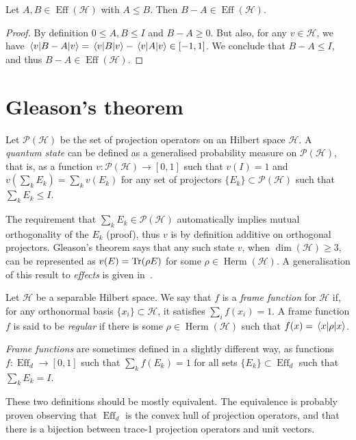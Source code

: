 \documentclass[12pt]{report}
\newcommand{\on}[1]{\operatorname{#1}}
\newcommand{\calH}{{\mathcal{H}}}
\newcommand{\calP}{{\mathcal{P}}}
\DeclareMathOperator{\Herm}{Herm}
\begin{document}
\begin{prop}
	Let $A,B\in\on{Eff}(\calH)$ with $A\le B$. Then $B-A\in\on{Eff}(\calH)$.
	\label{prop:diff_of_effects_is_effect}
\end{prop}
\begin{proof}
	By definition $0\le A,B\le I$ and $B-A\ge 0$.
	But also, for any $v\in\calH$, we have
	$\mel{v}{B-A}{v}=\mel{v}{B}{v}-\mel{v}{A}{v}\in[-1,1]$.
	We conclude that $B-A\le I$, and thus $B-A\in\on{Eff}(\calH)$.
\end{proof}


\section{Gleason's theorem}

\begin{defn}
	Let $\calP(\calH)$ be the set of projection operators on an Hilbert space $\calH$. A \emph{quantum state} can be defined as a generalised probability measure on $\calP(\calH)$, that is, as a function $v:\calP(\calH)\to[0,1]$ such that $v(I)=1$ and
	$v(\sum_k E_k) = \sum_k v(E_k)$
	for any set of projectors $\{E_k\}\subset\calP(\calH)$ such that $\sum_k E_k\le I$.
\end{defn}
The requirement that $\sum_k E_k\in\calP(\calH)$ automatically implies mutual orthogonality of the $E_k$ (proof), thus $v$ is by definition additive on orthogonal projectors.
Gleason's theorem says that any such state $v$, when $\dim(\calH)\ge3$, can be represented as $v(E)=\Tr(\rho E)$ for some $\rho\in\Herm(\calH)$.
A generalisation of this result to \emph{effects} is given in~\parencite{busch2003quantum,caves2004gleasontype}.

\begin{defn}
	Let $\calH$ be a separable Hilbert space.
	We say that $f$ is a \emph{frame function} for $\calH$ if, for any orthonormal basis $\{x_i\}\subset\calH$, it satisfies
	$\sum_i f(x_i) = 1$.
	A frame function $f$ is said to be \emph{regular} if there is some $\rho\in\Herm(\calH)$ such that $f(x)=\mel{x}{\rho}{x}$.
\end{defn}

\begin{defn}
	\emph{Frame functions} are sometimes defined in a slightly different way, as functions $f:\on{Eff}_d\to[0,1]$ such that $\sum_k f(E_k)=1$ for all sets $\{E_k\}\subset\on{Eff}_d$ such that $\sum_k E_k=I$.
\end{defn}
These two definitions should be mostly equivalent. The equivalence is probably proven observing that $\on{Eff}_d$ is the convex hull of projection operators, and that there is a bijection between trace-1 projection operators and unit vectors.
\end{document}
